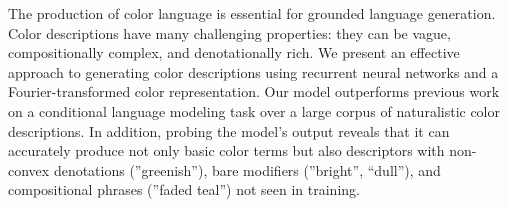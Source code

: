 The production of color language is essential for grounded language generation. Color descriptions have many challenging properties: they can be vague, compositionally complex, and denotationally rich. We present an effective approach to generating color descriptions using recurrent neural networks and a Fourier-transformed color representation. Our model outperforms previous work on a conditional language modeling task over a large corpus of naturalistic color descriptions. In addition, probing the model's output reveals that it can accurately produce not only basic color terms but also descriptors with non-convex denotations (''greenish''), bare modifiers (''bright'', ``dull''), and compositional phrases (''faded teal'') not seen in training.
